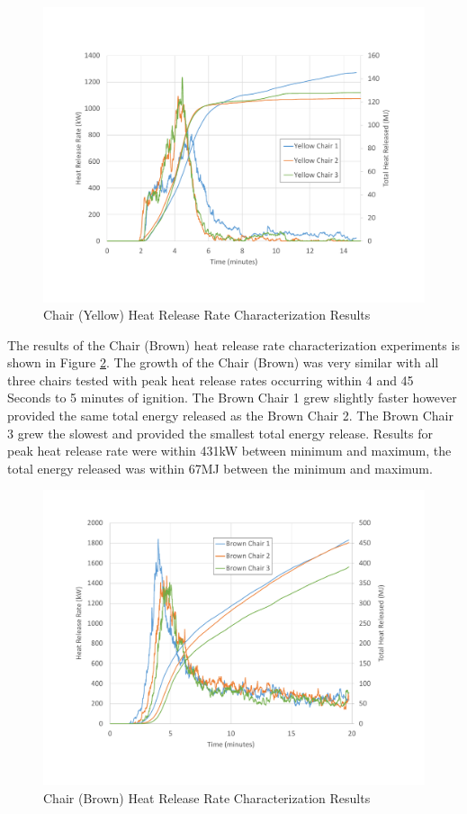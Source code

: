 \documentclass{article}
\begin{document}
\begin{figure}[H]
	\centering
	\includegraphics[width=\textwidth]{0_Images/Furniture/ChairYellow_HRR.pdf}
	\caption{Chair (Yellow) Heat Release Rate Characterization Results}
	\label{fig:YellowChairHRR}
\end{figure}

\clearpage

The results of the Chair (Brown) heat release rate characterization experiments is shown in Figure \ref{fig:BrownChairHRR}. The growth of the Chair (Brown) was very similar with all three chairs tested with peak heat release rates occurring within 4 and 45 Seconds to 5 minutes of ignition. The Brown Chair 1 grew slightly faster however provided the same total energy released as the Brown Chair 2. The Brown Chair 3 grew the slowest and provided the smallest total energy release. Results for peak heat release rate were within 431kW between minimum and maximum, the total energy released was within 67MJ between the minimum and maximum. 

\begin{figure}[H]
	\centering
	\includegraphics[height=0.45\textheight]{0_Images/Furniture/BrownChair_HRR.pdf}
	\caption{Chair (Brown) Heat Release Rate Characterization Results}
	\label{fig:BrownChairHRR}
\end{figure}
\end{document}
